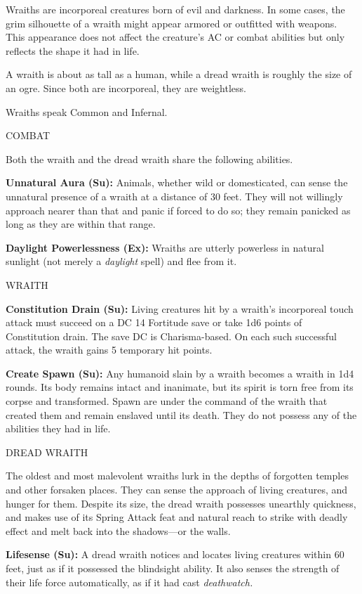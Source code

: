 \documentclass{article}
\begin{document}
Wraiths are incorporeal creatures born of evil and darkness. In some cases, the 
grim silhouette of a wraith might appear armored or outfitted with weapons. This 
appearance does not affect the creature's AC or combat abilities but only reflects 
the shape it had in life.

A wraith is about as tall as a human, while a dread wraith is roughly the size 
of an ogre. Since both are incorporeal, they are weightless.

Wraiths speak Common and Infernal.

COMBAT

Both the wraith and the dread wraith share the following abilities.

\textbf{Unnatural Aura (Su):} Animals, whether wild or domesticated, can sense 
the unnatural presence of a wraith at a distance of 30 feet. They will not willingly 
approach nearer than that and panic if forced to do so; they remain panicked as 
long as they are within that range.

\textbf{Daylight Powerlessness (Ex):} Wraiths are utterly powerless in natural 
sunlight (not merely a \textit{daylight }spell) and flee from it. 

WRAITH

\textbf{Constitution Drain (Su):} Living creatures hit by a wraith's incorporeal 
touch attack must succeed on a DC 14 Fortitude save or take 1d6 points of Constitution 
drain. The save DC is Charisma-based. On each such successful attack, the wraith 
gains 5 temporary hit points.

\textbf{Create Spawn (Su):} Any humanoid slain by a wraith becomes a wraith in 
1d4 rounds. Its body remains intact and inanimate, but its spirit is torn free 
from its corpse and transformed. Spawn are under the command of the wraith that 
created them and remain enslaved until its death. They do not possess any of the 
abilities they had in life.

DREAD WRAITH

The oldest and most malevolent wraiths lurk in the depths of forgotten temples 
and other forsaken places. They can sense the approach of living creatures, and 
hunger for them. Despite its size, the dread wraith possesses unearthly quickness, 
and makes use of its Spring Attack feat and natural reach to strike with deadly 
effect and melt back into the shadows---or the walls.

\textbf{Lifesense (Su):} A dread wraith notices and locates living creatures within 
60 feet, just as if it possessed the blindsight ability. It also senses the strength 
of their life force automatically, as if it had cast \textit{deathwatch.}
\end{document}
